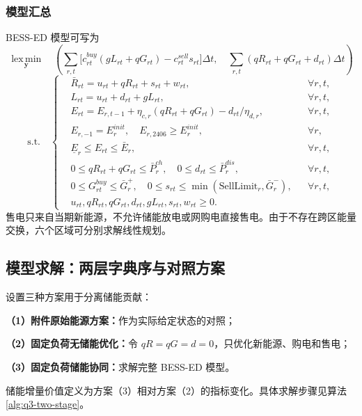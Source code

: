 \subsubsection{模型汇总}

BESS-ED 模型可写为
\begin{equation}
\operatorname*{lex\,min}_{\mathbf y}\quad
\left(
\sum_{r,t}\bigl[c^{buy}_{rt}(gL_{rt}+qG_{rt})-c^{sell}_{rt}s_{rt}\bigr]\Delta t,
\quad
\sum_{r,t}(qR_{rt}+qG_{rt}+d_{rt})\Delta t
\right)
\label{eq:q3-summary-obj}
\end{equation}
\begin{equation}
\mathrm{s.t.}\quad
\left\{
\begin{aligned}
&\bar R_{rt}=u_{rt}+qR_{rt}+s_{rt}+w_{rt},&&\forall r,t,\\
&L_{rt}=u_{rt}+d_{rt}+gL_{rt},&&\forall r,t,\\
&E_{rt}=E_{r,t-1}+\eta_{c,r}(qR_{rt}+qG_{rt})-d_{rt}/\eta_{d,r},&&\forall r,t,\\
&E_{r,-1}=E_r^{init},\quad E_{r,2406}\ge E_r^{init},&&\forall r,\\
&\underline E_r\le E_{rt}\le\bar E_r,&&\forall r,t,\\
&0\le qR_{rt}+qG_{rt}\le\bar P_r^{ch},\quad0\le d_{rt}\le\bar P_r^{dis},&&\forall r,t,\\
&0\le G^{buy}_{rt}\le\bar G_r^+,\quad0\le s_{rt}\le\min(\mathrm{SellLimit}_r,\bar G_r^-),&&\forall r,t,\\
&u_{rt},qR_{rt},qG_{rt},d_{rt},gL_{rt},s_{rt},w_{rt}\ge0.&&
\end{aligned}
\right.
\label{eq:q3-summary-con}
\end{equation}
售电只来自当期新能源，不允许储能放电或网购电直接售电。由于不存在跨区能量交换，六个区域可分别求解线性规划。

\subsection{模型求解：两层字典序与对照方案}

设置三种方案用于分离储能贡献：

\noindent\textbf{（1）附件原始能源方案：}作为实际给定状态的对照；

\noindent\textbf{（2）固定负荷无储能优化：}令 $qR=qG=d=0$，只优化新能源、购电和售电；

\noindent\textbf{（3）固定负荷储能协同：}求解完整 BESS-ED 模型。

储能增量价值定义为方案（3）相对方案（2）的指标变化。具体求解步骤见算法\ref{alg:q3-two-stage}。


